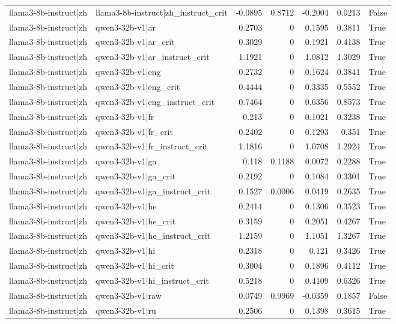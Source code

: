 \begin{table}
\begin{tabular}{l l r r r r l}
llama3-8b-instruct|zh & llama3-8b-instruct|zh_instruct_crit & -0.0895 & 0.8712 & -0.2004 & 0.0213 & False \\
llama3-8b-instruct|zh & qwen3-32b-v1|ar & 0.2703 & 0 & 0.1595 & 0.3811 & True \\
llama3-8b-instruct|zh & qwen3-32b-v1|ar_crit & 0.3029 & 0 & 0.1921 & 0.4138 & True \\
llama3-8b-instruct|zh & qwen3-32b-v1|ar_instruct_crit & 1.1921 & 0 & 1.0812 & 1.3029 & True \\
llama3-8b-instruct|zh & qwen3-32b-v1|eng & 0.2732 & 0 & 0.1624 & 0.3841 & True \\
llama3-8b-instruct|zh & qwen3-32b-v1|eng_crit & 0.4444 & 0 & 0.3335 & 0.5552 & True \\
llama3-8b-instruct|zh & qwen3-32b-v1|eng_instruct_crit & 0.7464 & 0 & 0.6356 & 0.8573 & True \\
llama3-8b-instruct|zh & qwen3-32b-v1|fr & 0.213 & 0 & 0.1021 & 0.3238 & True \\
llama3-8b-instruct|zh & qwen3-32b-v1|fr_crit & 0.2402 & 0 & 0.1293 & 0.351 & True \\
llama3-8b-instruct|zh & qwen3-32b-v1|fr_instruct_crit & 1.1816 & 0 & 1.0708 & 1.2924 & True \\
llama3-8b-instruct|zh & qwen3-32b-v1|ga & 0.118 & 0.1188 & 0.0072 & 0.2288 & True \\
llama3-8b-instruct|zh & qwen3-32b-v1|ga_crit & 0.2192 & 0 & 0.1084 & 0.3301 & True \\
llama3-8b-instruct|zh & qwen3-32b-v1|ga_instruct_crit & 0.1527 & 0.0006 & 0.0419 & 0.2635 & True \\
llama3-8b-instruct|zh & qwen3-32b-v1|he & 0.2414 & 0 & 0.1306 & 0.3523 & True \\
llama3-8b-instruct|zh & qwen3-32b-v1|he_crit & 0.3159 & 0 & 0.2051 & 0.4267 & True \\
llama3-8b-instruct|zh & qwen3-32b-v1|he_instruct_crit & 1.2159 & 0 & 1.1051 & 1.3267 & True \\
llama3-8b-instruct|zh & qwen3-32b-v1|hi & 0.2318 & 0 & 0.121 & 0.3426 & True \\
llama3-8b-instruct|zh & qwen3-32b-v1|hi_crit & 0.3004 & 0 & 0.1896 & 0.4112 & True \\
llama3-8b-instruct|zh & qwen3-32b-v1|hi_instruct_crit & 0.5218 & 0 & 0.4109 & 0.6326 & True \\
llama3-8b-instruct|zh & qwen3-32b-v1|raw & 0.0749 & 0.9969 & -0.0359 & 0.1857 & False \\
llama3-8b-instruct|zh & qwen3-32b-v1|ru & 0.2506 & 0 & 0.1398 & 0.3615 & True \\

\end{tabular}
\end{table}
